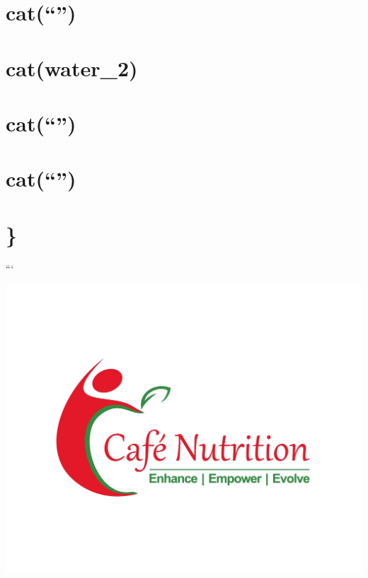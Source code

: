 \documentclass[]{article}
\begin{document}
\section{\texorpdfstring{cat(``\n'')}{cat()}}\label{cat-57}

\section{cat(water\_2)}\label{catwater_2}

\section{\texorpdfstring{cat(``\n'')}{cat()}}\label{cat-58}

\section{\texorpdfstring{cat(``\n'')}{cat()}}\label{cat-59}

\section{\}}\label{section-17}

```

\newpage

\includegraphics{cn_logo.jpg}
\end{document}
